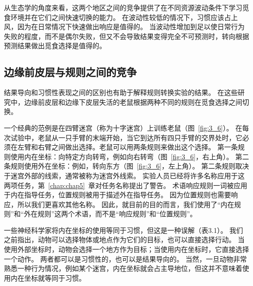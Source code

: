 从生态学的角度来看，这两个地区之间的竞争提供了在不同资源波动条件下学习觅食环境并在它们之间快速切换的能力。
在波动性较低的情况下，习惯应该占上风，因为在日常情况下快速做出响应是值得的。
当波动性增加到足以使日常行为失败的程度，而不是偶尔失败，但又不会导致结果变得完全不可预测时，转向根据预测结果做出觅食选择是值得的。\par



\subsection{边缘前皮层与规则之间的竞争}

结果导向和习惯性表现之间的区别也有助于解释规则转换实验的结果。
在这些研究中，边缘前皮层和边缘下皮层失活的老鼠根据两种不同的规则在觅食选择之间切换。\par


一个经典的范例是在四臂迷宫（称为十字迷宫）上训练老鼠（图~\ref{fig:3_6}）。
在每次试验中，老鼠从一只手臂的末端开始，当它到达所有四只手臂的交界处时，它必须在左臂和右臂之间做出选择。老鼠可以用两条规则来做出这个选择。
第一条规则使用内在坐标：向特定方向转弯，例如向右转弯（图~\ref{fig:3_6}，右上角）。
第二条规则使用外在坐标：例如，转向东方（图~\ref{fig:3_6}，左上角）。
第二条规则取决于迷宫外部的线索，通常被称为迷宫外线索。
实验人员已经将许多名称应用于这两项任务，第~\ref{chap:chap5}~章对任务名称提出了警告。
术语响应规则一词被应用于内在指导任务，位置规则被用于描述外在指导任务。
因为位置规则也需要响应，所以我们更喜欢其他名称。
因此，就目前的目的而言，我们使用了“内在规则”和“外在规则”这两个术语，而不是“响应规则”和“位置规则”。\par


一些神经科学家将内在坐标的使用等同于习惯，但这是一种误解（表3.1）。
我们之前指出，动物可以选择物体或地点作为它们的目标，也可以直接选择行动。
当使用外部坐标时，动物会选择一个地方作为目标；当使用内在坐标时，它直接选择一个动作。
两者都可以是习惯性的，也可以是结果导向的。
当然，一旦动物非常熟悉一种行为情况，例如某个迷宫，内在坐标就会占主导地位，但这并不意味着使用内在坐标就等同于习惯。\par


